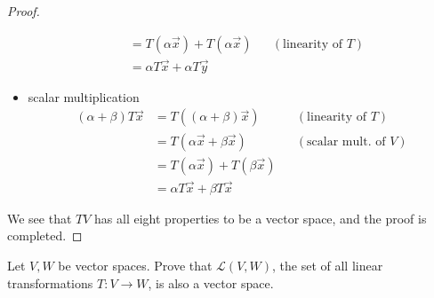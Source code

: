 \documentclass{article}
\begin{document}
\begin{proof}
\begin{itemize}
\begin{align*}
        &=T(\alpha\vec{x})+T(\alpha\vec{x}) && (\text{linearity of $T$})\\
        &=\alpha T\vec{x}+\alpha T\vec{y}
      \end{align*}
    \item scalar multiplication
      \begin{align*}
        (\alpha+\beta)T\vec{x}
        &=T((\alpha+\beta)\vec{x}) && (\text{linearity of $T$})\\
        &=T(\alpha\vec{x}+\beta\vec{x}) && (\text{scalar mult. of $V$})\\
        &=T(\alpha\vec{x})+T(\beta\vec{x}) \\
        &=\alpha T\vec{x}+\beta T\vec{x}
      \end{align*}
  \end{itemize}
  We see that $TV$ has all eight properties to be a vector space, and the proof
  is completed.


\end{proof}
\begin{homework}
  Let $V,W$ be vector spaces. Prove that $\mathcal{L}(V,W)$, the set of all 
  linear transformations $T:V\to W$, is also a vector space.
\end{homework}
\end{document}

